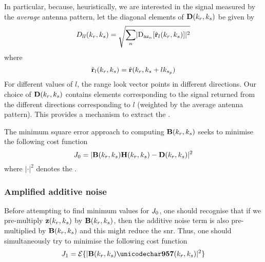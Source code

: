 In particular, because, heuristically, we are interested in the signal measured by the {\em average} antenna pattern, let the diagonal elements of $\diagAntennaMatrix(\kargs)$ be given by
\begin{equation}
 \gweight{ll}(\kargs) = \sqrt{\sum_n\lvert\dazPattern{\channelIndex}[\uRangeVectorl{l}{\kargs}]\rvert^2}
 \label{eq:averagePattern}
\end{equation}
where
\begin{equation}
 \hat{\mathbf{r}}_{l}(k_r,k_{s}) = \hat{\mathbf{r}}(k_r, k_{s}+lk_{s_p})
\end{equation}
For different values of $l$, the range look vector points in different directions. Our choice of $\diagAntennaMatrix(\kargs)$ contains elements corresponding to the signal returned from the different directions corresponding to $l$ (weighted by the average antenna pattern). This provides a mechanism to extract the . 
\par
The minimum square error approach to computing $\hrwsFilterMatrix(\kargs)$ seeks to minimise the following cost function
\begin{equation}
\costFunction{0} = \lvert\hrwsFilterMatrix(\kargs)\antennaMatrix(\kargs) - \diagAntennaMatrix(\kargs)\rvert^2
\end{equation}
where $\lvert\cdot\rvert^2$ denotes the . 
\subsubsection{Amplified additive noise}
Before attempting to find minimum values for $J_{0}$, one should recognise that if we pre-multiply $\mathbf{z}(k_r, k_{s})$ by $\hrwsFilterMatrix(\kargs)$, then the additive noise term is also pre-multiplied by $\hrwsFilterMatrix(\kargs)$ and this might reduce the \gls{snr}. Thus, one should simultaneously try to minimise the following cost function
\begin{equation}
 \costFunction{1} = \expct{\lvert\hrwsFilterMatrix(\kargs)\NkNkMP(\kargs)\rvert^2}
\end{equation}
 
